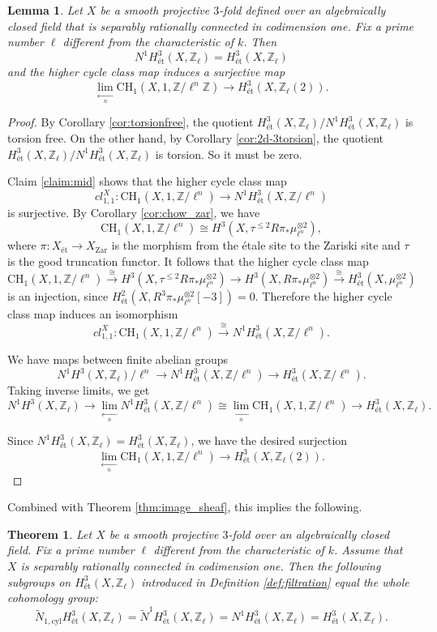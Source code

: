 \documentclass{amsart}
\newtheorem{thm}[theorem]{Theorem}
\newtheorem{lem}[theorem]{Lemma}
\theoremstyle{definition}
\theoremstyle{remark}
\newcommand{\mbb}{\mathbb}
\newcommand{\ZZ}{\mbb{Z}}
\newcommand{\cyl}{\text{cyl}}
\newcommand{\et}{\text{\'et}}
\begin{document}
\begin{lem}\label{3fold}
    Let $X$ be a smooth projective $3$-fold defined over an algebraically closed field that is separably rationally connected in codimension one. Fix a prime number $\ell$ different from the characteristic of $k$.  Then 
    \[
    N^1H^3_\et(X, \ZZ_\ell)=H^3_\et(X, \ZZ_\ell)
    \]
    and the higher cycle class map induces a surjective map
    \[
    \lim \limits_{\xleftarrow[n]{}}\text{CH}_1({X}, 1, \ZZ/\ell^n \ZZ) \to H^{3}_\text{\'et}({X}, \ZZ_\ell(2)).
    \]
\end{lem}
\begin{proof}
By Corollary \ref{cor:torsionfree}, the quotient $H^3_\et(X, \ZZ_\ell)/N^1H^3_\et(X, \ZZ_\ell)$ is torsion free. 
On the other hand, by Corollary \ref{cor:2d-3torsion}, the quotient $H^3_\et(X, \ZZ_\ell)/N^1H^3_\et(X, \ZZ_\ell)$ is torsion. So it must be zero.

    Claim \ref{claim:mid} shows that the higher cycle class map $$cl_{1, 1}^X: \text{CH}_1(X, 1, \ZZ/\ell^n) \to N^1H^3_\et(X, \ZZ/\ell^n)$$ is surjective.
 By Corollary \ref{cor:chow_zar}, we have 
\[
\text{CH}_1(X, 1, \ZZ/\ell^n) \cong H^3(X, \tau^{\leq 2}R\pi_*{\mu_{\ell^n}^{\otimes 2}}),
\]
where $\pi: X_\et \to X_\text{Zar}$ is the morphism from the \'etale site to the Zariski site and $\tau$ is the good truncation functor.
It follows that the higher cycle class map 
\[
\text{CH}_1(X, 1, \ZZ/\ell^n) \xrightarrow{\cong} H^3(X, \tau^{\leq 2}R\pi_*{\mu_{\ell^n}^{\otimes 2}}) \to  H^3(X, R\pi_*{\mu_{\ell^n}^{\otimes 2}})\xrightarrow{\cong} H^3_\et(X, \mu_{\ell^n}^{\otimes 2})
\]
is an injection,
since $H^2_\et(X, R^3\pi_*{\mu_{\ell^n}^{\otimes 2}}[-3])=0$.
Therefore the higher cycle class map induces an isomorphism $$cl_{1, 1}^X: \text{CH}_1(X, 1, \ZZ/\ell^n) \xrightarrow{\cong} N^1H^3_\et(X, \ZZ/\ell^n).$$

We have maps between finite abelian groups
\[
N^1H^3(X, \ZZ_\ell)/\ell^n \to N^1H^3_\et(X, \ZZ/\ell^n) \to H^3_\et(X, \ZZ/\ell^n).
\]
Taking inverse limits, we get
\[
N^1H^3(X, \ZZ_\ell) \to \lim \limits_{ \xleftarrow[n]{}} N^1H^3_\et(X, \ZZ/\ell^n) \cong \lim \limits_{\xleftarrow[n]{}} \text{CH}_1(X, 1, \ZZ/\ell^n)  \to H^3_\et(X, \ZZ_\ell).
\]

Since $N^1H^3_\et(X, \ZZ_\ell)=H^3_\et(X, \ZZ_\ell)$, we have the desired surjection
\[
 \lim \limits_{\xleftarrow[n]{}} \text{CH}_1(X, 1, \ZZ/\ell^n)  \to H^3_\et(X, \ZZ_\ell(2)).
\]
\end{proof}
 
Combined with Theorem \ref{thm:image_sheaf}, this implies the following.
 \begin{thm}\label{thm:surj_dim3_chow}
 Let $X$ be a smooth projective $3$-fold over an algebraically closed field. 
 Fix a prime number $\ell$ different from the characteristic of $k$. 
 Assume that $X$ is separably rationally connected in codimension one. Then the following subgroups on $H^{3}_\et(X, \ZZ_\ell)$ introduced in Definition \ref{def:filtration} equal the whole cohomology group:
\[
 \tilde{N}_{1, \cyl}H^{3}_\et(X, \ZZ_\ell) = \tilde{N}^{1}H^{3}_\et(X, \ZZ_\ell) =N^1H^{3}_\et(X, \ZZ_\ell)=H^{3}_\et(X, \ZZ_\ell).
\]
 \end{thm}
\end{document}
